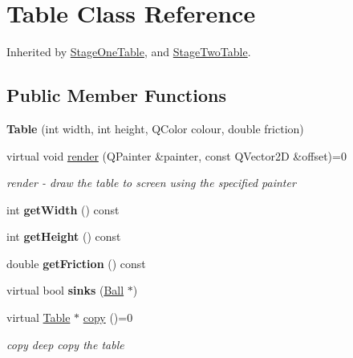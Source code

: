 \hypertarget{class_table}{}\section{Table Class Reference}
\label{class_table}


Inherited by \mbox{\hyperlink{class_stage_one_table}{Stage\+One\+Table}}, and \mbox{\hyperlink{class_stage_two_table}{Stage\+Two\+Table}}.

\subsection*{Public Member Functions}
\begin{DoxyCompactItemize}
\item 
\mbox{\label{class_table_a7f7c9dbfd3a6ebf5360cfd30e6d9ceb6}} 
{\bfseries Table} (int width, int height, Q\+Color colour, double friction)
\item 
virtual void \mbox{\hyperlink{class_table_a827dac18920a95b3e0ef006183514654}{render}} (Q\+Painter \&painter, const Q\+Vector2D \&offset)=0
\begin{DoxyCompactList}\small\item\em render -\/ draw the table to screen using the specified painter \end{DoxyCompactList}\item 
\mbox{\label{class_table_a767798fbd671c4c6805091a116439444}} 
int {\bfseries get\+Width} () const
\item 
\mbox{\label{class_table_a3c40550751e65b563b3f1759bd12985c}} 
int {\bfseries get\+Height} () const
\item 
\mbox{\label{class_table_a250960dffeb3fa744bf098a49ef78d8a}} 
double {\bfseries get\+Friction} () const
\item 
\mbox{\label{class_table_ab3eb192b2a06e26349d651e4e6de063a}} 
virtual bool {\bfseries sinks} (\mbox{\hyperlink{class_ball}{Ball}} $\ast$)
\item 
virtual \mbox{\hyperlink{class_table}{Table}} $\ast$ \mbox{\hyperlink{class_table_a881295d0bea9823026471422ec203c6e}{copy}} ()=0
\begin{DoxyCompactList}\small\item\em copy deep copy the table \end{DoxyCompactList}\end{DoxyCompactItemize}

